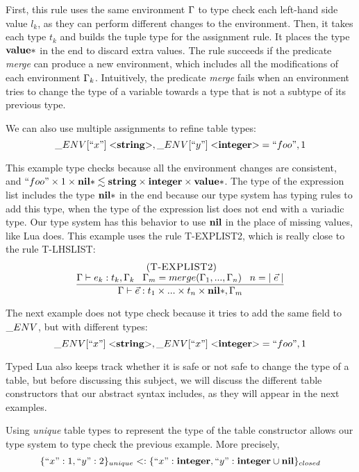 First, this rule uses the same environment $\Gamma$ to type check each
left-hand side value $l_{k}$, as they can perform different changes
to the environment.
Then, it takes each type $t_{k}$ and builds the tuple type for
the assignment rule.
It places the type $\mathbf{value}{*}$ in the end to discard extra values.
The rule succeeds if the predicate \emph{merge} can
produce a new environment, which includes all the modifications
of each environment $\Gamma_{k}$.
Intuitively, the predicate \emph{merge} fails when an environment
tries to change the type of a variable towards a type that is not
a subtype of its previous type.

We can also use multiple assignments to refine table types:
\[
\string_ENV[``x"] \; {<}\String{>}, \string_ENV[``y"] \; {<}\Integer{>} = ``foo", 1
\]

This example type checks because all the environment changes are consistent, and
$``foo" \times 1 \times \mathbf{nil}{*} \lesssim \mathbf{string} \times \mathbf{integer} \times \mathbf{value}{*}$.
The type of the expression list includes the type $\mathbf{nil}{*}$ in the end
because our type system has typing rules to add this type,
when the type of the expression list does not end with a variadic type.
Our type system has this behavior to use $\mathbf{nil}$ in the place of missing
values, like Lua does.
This example uses the rule \textsc{T-EXPLIST2}, which is really close
to the rule \textsc{T-LHSLIST}:
\[
\begin{array}{c}
\; (\textsc{T-EXPLIST2})\\
\dfrac{\Gamma \vdash e_{k}:t_{k}, \Gamma_{k} \;\;\;
       \Gamma_{m} = merge(\Gamma_{1}, ..., \Gamma_{n}) \;\;\;
       n = |\;\vec{e}\;|}
      {\Gamma \vdash \vec{e}:t_{1} \times ... \times t_{n} \times \mathbf{nil}{*}, \Gamma_{m}}
\end{array}
\]

The next example does not type check because it tries to add
the same field to $\string_ENV$, but with different types:
\[
\string_ENV[``x"] \; {<}\String{>}, \string_ENV[``x"] \; {<}\Integer{>} = ``foo", 1
\]

Typed Lua also keeps track whether it is safe or not safe to
change the type of a table, but before discussing this subject,
we will discuss the different table constructors that our
abstract syntax includes, as they will appear in the next
examples.

Using \emph{unique} table types to represent the type of the table
constructor allows our type system to type check the previous example.
More precisely,
\[
\{``x":1, ``y":2\}_{unique} <: \{``x":\mathbf{integer}, ``y":\mathbf{integer} \cup \mathbf{nil}\}_{closed}
\]

